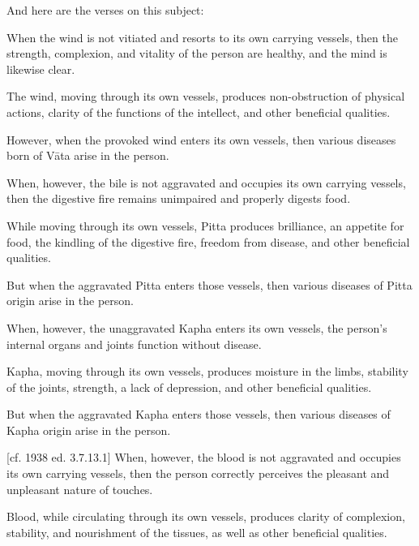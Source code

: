 \begin{translation}
\begin{tt}
\item[8]
And here are the verses on this subject:

\item[8.0]
When the wind is not vitiated and resorts to its own carrying vessels, then the strength, complexion, and vitality of the person are healthy, and the mind is likewise clear.

\item[8.1]
The wind, moving through its own vessels, produces non-obstruction of physical actions, clarity of the functions of the intellect, and other beneficial qualities.

\item[9]
However, when the provoked wind enters its own vessels, then various diseases born of Vāta arise in the person.

\item[9.add]
When, however, the bile is not aggravated and occupies its own carrying vessels, then the digestive fire remains unimpaired and properly digests food.

\item[10]
While moving through its own vessels, Pitta produces brilliance, an appetite for food, the kindling of the digestive fire, freedom from disease, and other beneficial qualities.

\item[11]
But when the aggravated Pitta enters those vessels, then various diseases of Pitta origin arise in the person.

\item[11.1]
When, however, the unaggravated Kapha enters its own vessels, the person's internal organs and joints function without disease.

\item[12]
Kapha, moving through its own vessels, produces moisture in the limbs, stability of the joints, strength, a lack of depression, and other beneficial qualities.

\item[13]
But when the aggravated Kapha enters those vessels, then various diseases of Kapha origin arise in the person.

[cf. 1938 ed. 3.7.13.1]
When, however, the blood is not aggravated and occupies its own carrying vessels, then the person correctly perceives the pleasant and unpleasant nature of touches.

\item[14]
Blood, while circulating through its own vessels, produces clarity of complexion, stability, and nourishment of the tissues, as well as other beneficial qualities.


\end{tt}
\end{translation}
